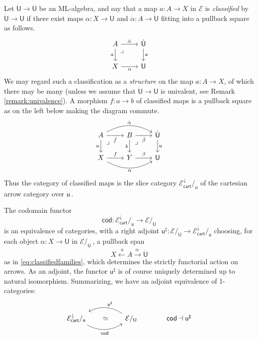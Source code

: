 \documentclass[12pt,reqno]{amsart}
\newcommand{\EE}{\ensuremath{\mathcal{E}}}
\renewcommand{\to}{\ensuremath{\rightarrow}}
\newcommand{\too}{\ensuremath{\longrightarrow}}
\renewcommand{\t}{\ensuremath{\mathsf{u}}}
\newcommand{\T}{\ensuremath{\mathsf{U}}}
\newcommand{\TT}{\ensuremath{\dot{\mathsf{U}}}}
\newcommand{\pbcorner}{\arrow[dr,phantom,"\lrcorner" very near start, shift right=.5ex]} %
\theoremstyle{remark}
\theoremstyle{definition}
\begin{document}
Let $\TT \to \T$ be an ML-algebra, and say that a map $a : A\to X$ in $\EE$ is \emph{classified} by $\TT \to \T$ if there exist maps $\alpha : X \to \T$ and $\dot{\alpha} : A \to \TT$ fitting into a pullback square as follows.
\begin{equation}\label{eq:classifiedfamilies}
\begin{tikzcd}
	 A \ar[d, swap, "a"] \pbcorner \ar[r, "\dot{\alpha}"] & \TT \ar[d, "\t"] \\  
	X \ar[r, swap, "\alpha"] & \T 
 \end{tikzcd}
 \end{equation}
 We may regard such a classification as a \emph{structure} on the map $a : A\to X$, of which there may be many (unless we assume that $\TT \to \T$ is univalent, see Remark \ref{remark:univalence}).  A morphism $f : a \to b$ of classified maps is a pullback square as on the left below making the diagram commute.
 \begin{equation}\label{eq:classifiedfamilies2}
\begin{tikzcd}
	A \ar[d,swap, "a"] \ar[r,swap, "\dot{f}"]  \ar[rr, bend left, "\dot{\alpha}"]  \pbcorner & B \ar[d,swap, "b"]   \ar[r,swap,  "\dot{\beta}"] \pbcorner & \TT \ar[d, "\t"]  \\  
	X \ar[r, "f"] \ar[rr,swap, bend right, "\alpha"] & Y  \ar[r, "{\beta}"] &  \T
 \end{tikzcd}
 \end{equation}
 Thus the category of classified maps is the slice category $\EE^{\downarrow}_{\mathsf{cart}}/_{\t}$  of the cartesian arrow category over $\t$\,.

The codomain functor
\[
\mathsf{cod} : \EE^{\downarrow}_{\mathsf{cart}}/_{\t} \too \EE/_\T
\]
is an equivalence of categories, with a right adjoint $\t^{\sharp} : \EE/_\T \to \EE^{\downarrow}_{\mathsf{cart}}/_{\t}$ choosing, for each object $\alpha : X \to \T$ in $\EE/_\T$\,, a pullback span $$X \stackrel{\ a}{\leftarrow} A \stackrel{\dot{\alpha}\ }{\to} \TT$$ as in \eqref{eq:classifiedfamilies}, which determines the strictly functorial action on arrows.  As an adjoint, the functor $\t^{\sharp}$ is of course uniquely determined up to natural isomorphism.  Summarizing, we have an adjoint equivalence of 1-categories:
 \begin{equation}\label{eq:slice adjunction}
\begin{tikzcd}
 {\EE^{\downarrow}_{\mathsf{cart}}/_{\t}}  \ar[rr, bend right, swap, "{\mathsf{cod} }"] \ar[rr, phantom, description, "{\simeq}"] && \ar[ll, bend right, swap, "{\t^{\sharp}}"] \EE/_\T & \quad \mathsf{cod} \dashv \t^{\sharp}
 \end{tikzcd}
 \end{equation}
\end{document}
